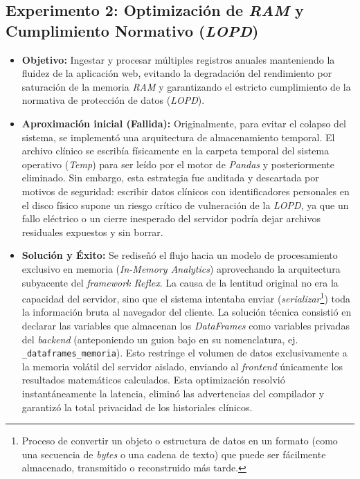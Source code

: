 \subsection{Experimento 2: Optimización de \textit{RAM} y Cumplimiento Normativo (\textit{LOPD})}
\begin{itemize}
    \item \textbf{Objetivo:} Ingestar y procesar múltiples registros anuales manteniendo la fluidez de la aplicación web, evitando la degradación del rendimiento por saturación de la memoria \textit{RAM} y garantizando el estricto cumplimiento de la normativa de protección de datos (\textit{LOPD}).
    
    \item \textbf{Aproximación inicial (Fallida):} Originalmente, para evitar el colapso del sistema, se implementó una arquitectura de almacenamiento temporal. El archivo clínico se escribía físicamente en la carpeta temporal del sistema operativo (\textit{Temp}) para ser leído por el motor de \textit{Pandas} y posteriormente eliminado. Sin embargo, esta estrategia fue auditada y descartada por motivos de seguridad: escribir datos clínicos con identificadores personales en el disco físico supone un riesgo crítico de vulneración de la \textit{LOPD}, ya que un fallo eléctrico o un cierre inesperado del servidor podría dejar archivos residuales expuestos y sin borrar.
    
    \item \textbf{Solución y Éxito:} Se rediseñó el flujo hacia un modelo de procesamiento exclusivo en memoria (\textit{In-Memory Analytics}) aprovechando la arquitectura subyacente del \textit{framework Reflex}. La causa de la lentitud original no era la capacidad del servidor, sino que el sistema intentaba enviar (\textit{serializar}\footnote{Proceso de convertir un objeto o estructura de datos en un formato (como una secuencia de \textit{bytes} o una cadena de texto) que puede ser fácilmente almacenado, transmitido o reconstruido más tarde.}) toda la información bruta al navegador del cliente. La solución técnica consistió en declarar las variables que almacenan los \textit{DataFrames} como variables privadas del \textit{backend} (anteponiendo un guion bajo en su nomenclatura, ej. \texttt{\_dataframes\_memoria}). Esto restringe el volumen de datos exclusivamente a la memoria volátil del servidor aislado, enviando al \textit{frontend} únicamente los resultados matemáticos calculados. Esta optimización resolvió instantáneamente la latencia, eliminó las advertencias del compilador y garantizó la total privacidad de los historiales clínicos.
\end{itemize}

